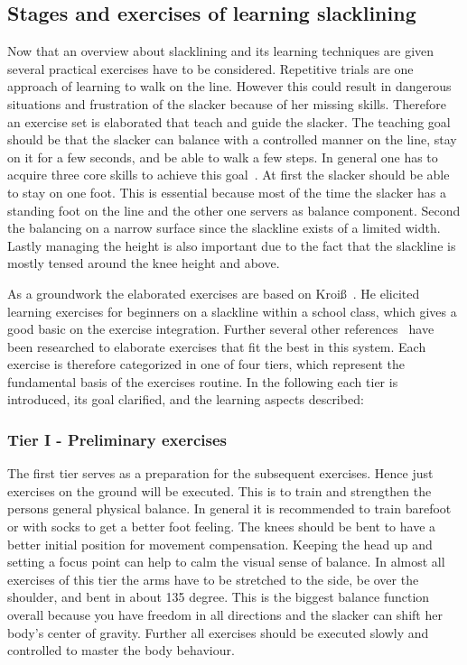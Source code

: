 \subsection{Stages and exercises of learning slacklining}\label{3_3_2_StagesExercises}
Now that an overview about slacklining and its learning techniques are given several practical exercises have to be considered. Repetitive trials are one approach of learning to walk on the line. However this could result in dangerous situations and frustration of the slacker because of her missing skills. Therefore an exercise set is elaborated that teach and guide the slacker. The teaching goal should be that the slacker can balance with a controlled manner on the line, stay on it for a few seconds, and be able to walk a few steps. In general one has to acquire three core skills to achieve this goal~\cite{Kroiss2007-ab}. At first the slacker should be able to stay on one foot. This is essential because most of the time the slacker has a standing foot on the line and the other one servers as balance component. Second the balancing on a narrow surface since the slackline exists of a limited width. Lastly managing the height is also important due to the fact that the slackline is mostly tensed around the knee height and above.

As a groundwork the elaborated exercises are based on Kroiß~\cite{Kroiss2007-ab}. He elicited learning exercises for beginners on a slackline within a school class, which gives a good basic on the exercise integration. Further several other references~\cite{Balcom2005-wl, Donath2013-kk, Donath2016-gm, Granacher2010-ow, Keller2012-xh, Kleindl2011-bl, Pfusterschmied2013-yy, Thomann2013-aa} have been researched to elaborate exercises that fit the best in this system. Each exercise is therefore categorized in one of four tiers, which represent the fundamental basis of the exercises routine. In the following each tier is introduced, its goal clarified, and the learning aspects described:

\subsubsection{Tier I - Preliminary exercises}
The first tier serves as a preparation for the subsequent exercises. Hence just exercises on the ground will be executed. This is to train and strengthen the persons general physical balance. In general it is recommended to train barefoot or with socks to get a better foot feeling. The knees should be bent to have a better initial position for movement compensation. Keeping the head up and setting a focus point can help to calm the visual sense of balance. In almost all exercises of this tier the arms have to be stretched to the side, be over the shoulder, and bent in about 135 degree. This is the biggest balance function overall because you have freedom in all directions and the slacker can shift her body's center of gravity. Further all exercises should be executed slowly and controlled to master the body behaviour.

